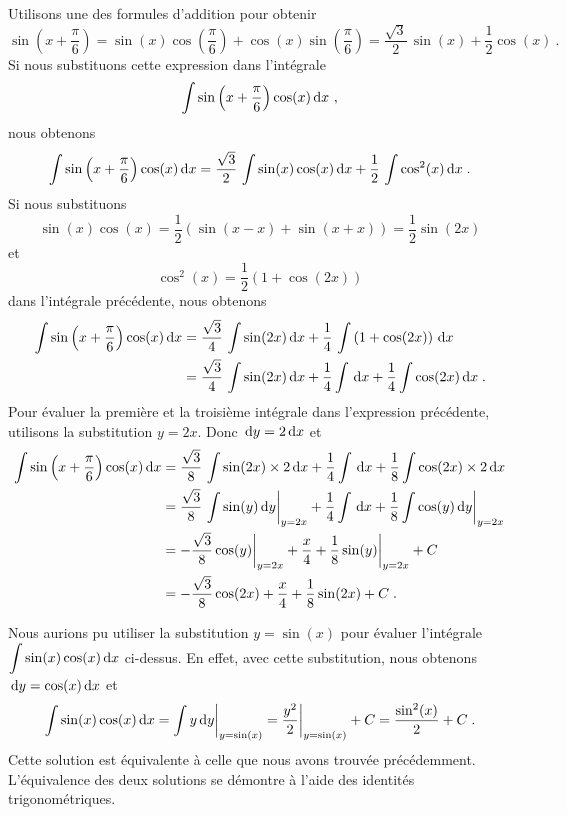 {\begin{egg}[\eng]
 Utilisons une des formules d'addition pour obtenir
\[
\sin\left(x+\frac{\pi}{6}\right) = \sin(x)\cos\left(\frac{\pi}{6}\right)
+ \cos(x)\sin\left(\frac{\pi}{6}\right)
= \frac{\sqrt{3}}{2}\,\sin(x) + \frac{1}{2}\cos(x) \ .
\]
Si nous substituons cette expression dans l'intégrale
\[
\int \sin\left(x+\frac{\pi}{6}\right)\cos(x) \,\mathrm{d}x \ ,
\]
nous obtenons
\[
\int \sin\left(x+\frac{\pi}{6}\right)\cos(x) \,\mathrm{d}x
= \frac{\sqrt{3}}{2}\,\int \sin(x)\cos(x) \,\mathrm{d}x +
\frac{1}{2}\, \int \cos^2(x) \,\mathrm{d}x \; .
\]
Si nous substituons
\[
\sin(x)\cos(x) = \frac{1}{2}\left(\sin(x-x)+\sin(x+x)\right)
= \frac{1}{2} \sin(2x)
\]
et
\[
  \cos^2(x) = \frac{1}{2}(1 + \cos(2x))
\]
dans l'intégrale précédente, nous obtenons
\begin{align*}
\int \sin\left(x+\frac{\pi}{6}\right)\cos(x) \,\mathrm{d}x
&= \frac{\sqrt{3}}{4}\, \int \sin(2x) \,\mathrm{d}x +
 \frac{1}{4}\,\int \left(1+\cos(2x)\right) \,\mathrm{d}x \\
&= \frac{\sqrt{3}}{4}\,\int \sin(2x) \,\mathrm{d}x +
\frac{1}{4} \int \,\mathrm{d}x + \frac{1}{4} \int \cos(2x) \,\mathrm{d}x \; . 
\end{align*}
Pour évaluer la première et la troisième intégrale dans l'expression
précédente, utilisons la substitution $y=2x$.
Donc $\,\mathrm{d}y = 2\,\mathrm{d}x$ et
\begin{align*}
\int \sin\left(x+\frac{\pi}{6}\right)\cos(x) \,\mathrm{d}x
&= \frac{\sqrt{3}}{8}\,\int \sin(2x)\times 2 \,\mathrm{d}x +
\frac{1}{4} \int \,\mathrm{d}x + \frac{1}{8} \int \cos(2x) \times 2\,\mathrm{d}x \\
  &= \frac{\sqrt{3}}{8}\,\int \sin(y) \,\mathrm{d}y\bigg|_{y=2x} +
\frac{1}{4} \int \,\mathrm{d}x + \frac{1}{8} \int \cos(y) \,\mathrm{d}y\bigg|_{y=2x} \\
&= -\frac{\sqrt{3}}{8} \cos(y)\bigg|_{y=2x} +
\frac{x}{4} + \frac{1}{8} \sin(y)\bigg|_{y=2x} +C \\
&=  -\frac{\sqrt{3}}{8} \cos(2x) + \frac{x}{4} + \frac{1}{8} \sin(2x) +C \; .
\end{align*}

Nous aurions pu utiliser la substitution $y=\sin(x)$ pour
évaluer l'intégrale\\ $\displaystyle \int \sin(x) \cos(x) \,\mathrm{d}x$
ci-dessus.  En effet, avec cette substitution, nous obtenons
$\,\mathrm{d}y = \cos(x) \,\mathrm{d}x$ 
et
\[
  \int \sin(x) \cos(x) \,\mathrm{d}x = \int y \,\mathrm{d}y \bigg|_{y=\sin(x)}
  = \frac{y^2}{2} \bigg|_{y=\sin(x)} + C
  = \frac{\sin^2(x)}{2} + C \; .
\]
Cette solution est équivalente à celle que nous avons trouvée
précédemment.  L'équivalence des deux solutions se démontre à l'aide 
des identités trigonométriques.
\end{egg}

}
